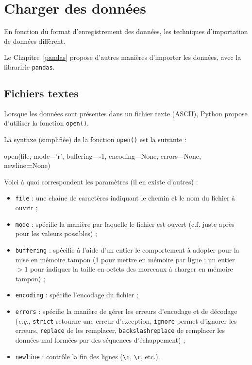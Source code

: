 \documentclass[12pt,]{book}
\newenvironment{Shaded}{\begin{snugshade}}{\end{snugshade}}
\newcommand{\DecValTok}[1]{\textcolor[rgb]{0.00,0.00,0.81}{#1}}
\newcommand{\StringTok}[1]{\textcolor[rgb]{0.31,0.60,0.02}{#1}}
\newcommand{\VariableTok}[1]{\textcolor[rgb]{0.00,0.00,0.00}{#1}}
\newcommand{\OperatorTok}[1]{\textcolor[rgb]{0.81,0.36,0.00}{\textbf{#1}}}
\newcommand{\BuiltInTok}[1]{#1}
\newcommand{\NormalTok}[1]{#1}
\providecommand{\tightlist}{%
  \setlength{\itemsep}{0pt}\setlength{\parskip}{0pt}}
\numberwithin{equation}{section}
\numberwithin{countremarque}{section}
\let\BeginKnitrBlock\begin \let\EndKnitrBlock\end
\begin{document}
\section{Charger des données}\label{charger-donnees}

En fonction du format d'enregistrement des données, les techniques
d'importation de données diffèrent.

\BeginKnitrBlock{remarque}
Le Chapitre~\ref{pandas} propose d'autres manières d'importer les
données, avec la libraririe \texttt{pandas}.
\EndKnitrBlock{remarque}

\subsection{Fichiers textes}\label{import-fichiers-texte}

Lorsque les données sont présentes dans un fichier texte (ASCII), Python
propose d'utiliser la fonction \texttt{open()}.

La syntaxe (simplifiée) de la fonction \texttt{open()} est la suivante :

\begin{Shaded}
\begin{Highlighting}[]
\BuiltInTok{open}\NormalTok{(}\BuiltInTok{file}\NormalTok{, mode}\OperatorTok{=}\StringTok{'r'}\NormalTok{, buffering}\OperatorTok{=-}\DecValTok{1}\NormalTok{,}
\NormalTok{  encoding}\OperatorTok{=}\VariableTok{None}\NormalTok{, errors}\OperatorTok{=}\VariableTok{None}\NormalTok{, newline}\OperatorTok{=}\VariableTok{None}\NormalTok{)}
\end{Highlighting}
\end{Shaded}

Voici à quoi correspondent les paramètres (il en existe d'autres) :

\begin{itemize}
\tightlist
\item
  \texttt{file} : une chaîne de caractères indiquant le chemin et le nom
  du fichier à ouvrir ;
\item
  \texttt{mode} : spécifie la manière par laquelle le fichier est ouvert
  (c.f. juste après pour les valeurs possibles) ;
\item
  \texttt{buffering} : spécifie à l'aide d'un entier le comportement à
  adopter pour la mise en mémoire tampon (1 pour mettre en mémoire par
  ligne ; un entier \(>1\) pour indiquer la taille en octets des
  morceaux à charger en mémoire tampon) ;
\item
  \texttt{encoding} : spécifie l'encodage du fichier ;
\item
  \texttt{errors} : spécifie la manière de gérer les erreurs d'encodage
  et de décodage (\emph{e.g.}, \texttt{strict} retourne une erreur
  d'exception, \texttt{ignore} permet d'ignorer les erreurs,
  \texttt{replace} de les remplacer, \texttt{backslashreplace} de
  remplacer les données mal formées par des séquences d'échappement) ;
\item
  \texttt{newline} : contrôle la fin des lignes
  (\texttt{\textbackslash{}n}, \texttt{\textbackslash{}r}, etc.).
\end{itemize}
\end{document}
